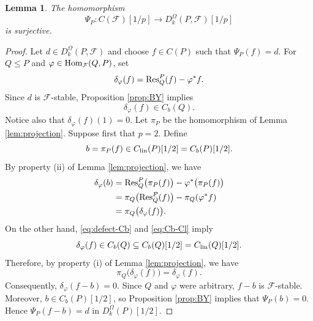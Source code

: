 \documentclass[preprint,12pt,3p]{elsarticle}
\newtheorem{lemma}[theorem]{Lemma}
\def\Res{{\rm Res}}
\def\Hom{{\rm Hom}}
\def\F{\mathcal{F}}
\begin{document}
\begin{lemma}\label{lem:away-p}
The homomorphism
$$
 \Psi_P:C(\F)[1/p]\longrightarrow D_k^\Omega(P,\F)[1/p]
$$
is surjective.
\end{lemma}

\begin{proof}
Let $d\in D_k^\Omega(P,\F)$ and choose $f\in C(P)$ such that $\Psi_P(f)=d$.  For $Q\leq P$ and $\varphi\in\Hom_\F(Q,P)$, set
$$
 \delta_\varphi(f)=\Res_Q^P(f)-\varphi^*f.
$$
Since $d$ is $\F$-stable, Proposition \ref{prop:BY} implies
\begin{equation}\label{eq:defect-Cb}
 \delta_\varphi(f)\in C_b(Q).
\end{equation}
Notice also that $\delta_\varphi(f)(1)=0$. Let $\pi_P$ be the homomorphism of Lemma \ref{lem:projection}. Suppose first that $p=2$.  Define
$$
 b=\pi_P(f)\in C_{\rm lin}(P)[1/2]=C_b(P)[1/2].
$$
By property (ii) of Lemma \ref{lem:projection}, we have
$$
 \begin{aligned}
 \delta_\varphi(b)
 &=\Res_Q^P\bigl(\pi_P(f)\bigr)-\varphi^*\bigl(\pi_P(f)\bigr)\\
 &=\pi_Q\bigl(\Res_Q^P(f)\bigr)-\pi_Q(\varphi^*f)\\
 &=\pi_Q\bigl(\delta_\varphi(f)\bigr).
 \end{aligned}
$$
On the other hand, \eqref{eq:defect-Cb} and \eqref{eq:Cb-Cl} imply
$$
 \delta_\varphi(f)\in C_b(Q)\subseteq C_b(Q)[1/2]=C_{\rm lin}(Q)[1/2].
$$
Therefore, by property (i) of Lemma \ref{lem:projection}, we have
$$
 \pi_Q\bigl(\delta_\varphi(f)\bigr)=\delta_\varphi(f).
$$
Consequently, $\delta_\varphi(f-b)=0$. Since $Q$ and $\varphi$ were arbitrary, $f-b$ is $\F$-stable. Moreover, $b\in C_b(P)[1/2]$, so Proposition \ref{prop:BY} implies that $\Psi_P(b)=0$. Hence $\Psi_P(f-b)=d$ in $D_k^\Omega(P)[1/2]$.


\end{proof}
\end{document}
